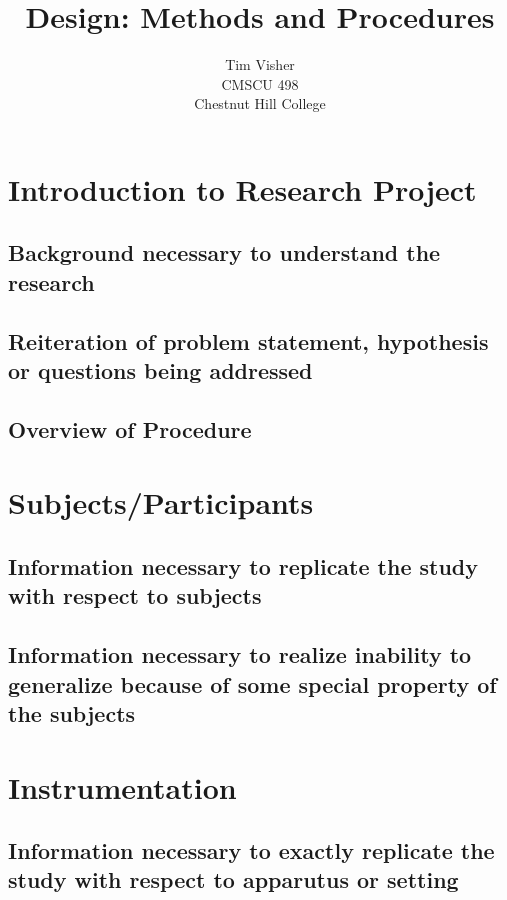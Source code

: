 \documentclass[12pt,oneside,letterpaper]{article}
\author{Tim Visher\\ CMSCU 498\\ Chestnut Hill College}
\title{Design: Methods and Procedures}
\begin{document}
\maketitle

\tableofcontents

\section{Introduction to Research Project}

\subsection{Background necessary to understand the research}

\subsection{Reiteration of problem statement, hypothesis or questions being
  addressed}

\subsection{Overview of Procedure}


\section{Subjects/Participants}

\subsection{Information necessary to replicate the study with respect to
  subjects}

\subsection{Information necessary to realize inability to generalize because of
  some special property of the subjects}

\section{Instrumentation}

\subsection{Information necessary to exactly replicate the study with respect to
  apparutus or setting}
\end{document}
